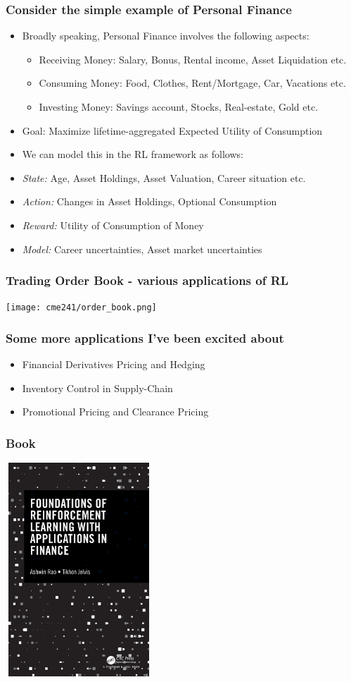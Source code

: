 \documentclass[handout]{beamer}
\begin{document}
\begin{frame}
\frametitle{Consider the simple example of Personal Finance}
\pause
\begin{itemize}[<+->]
\item Broadly speaking, Personal Finance involves the following aspects:
\pause
\begin{itemize}[<+->]
\item Receiving Money: Salary, Bonus, Rental income, Asset Liquidation etc.
\item Consuming Money: Food, Clothes, Rent/Mortgage, Car, Vacations etc.
\item Investing Money: Savings account, Stocks, Real-estate, Gold etc.
\end{itemize}
\item Goal: Maximize lifetime-aggregated Expected Utility of Consumption
\item We can model this in the RL framework as follows:
\item {\em State:} Age, Asset Holdings, Asset Valuation, Career situation etc.
\item {\em Action:} Changes in Asset Holdings, Optional Consumption
\item {\em Reward:} Utility of Consumption of Money
\item {\em Model:} Career uncertainties, Asset market uncertainties
\end{itemize}
\end{frame}


\begin{frame}
\frametitle{Trading Order Book - various applications of RL}
\texttt{[image: cme241/order\_book.png]}
\end{frame}

\begin{frame}
\frametitle{Some more applications I've been excited about}
\begin{itemize}[<+->]
\item Financial Derivatives Pricing and Hedging
\item Inventory Control in Supply-Chain
\item Promotional Pricing and Clearance Pricing
\end{itemize}
\end{frame}


\begin{frame}
\frametitle{Book}
\begin{center}
\includegraphics[width=5.5cm, height=8cm]{RLBook.jpeg}
\end{center}
\end{frame}
\end{document}
